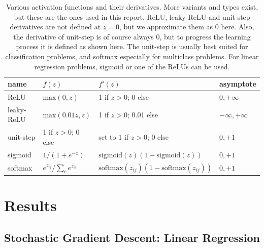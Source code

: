 \documentclass[]{article}
\begin{document}
\begin{table}[!ht]
	\caption{Various activation functions and their derivatives. More variants and types exist, but these are the ones used in this report. ReLU, leaky-ReLU and unit-step derivatives are not defined at $z=0$, but we approximate them as 0 here. Also, the derivative of unit-step is of course always 0, but to progress the learning process it is defined as shown here. The unit-step is usually best suited for classification problems, and softmax especially for multiclass problems. For linear regression problems, sigmoid or one of the ReLUs can be used.}
	\label{tab:activation-funcs}
	\begin{center}
		\begin{tabular}{l|l|l|l}
			\toprule
			name&	$f(z)$&	$f'(z)$&	asymptote \\
			\midrule
			ReLU&	$\mathrm{max}(0,z)$&	1 if $z > 0$; 0 else&	$0,+\infty$ \\
			leaky-ReLU&	$\mathrm{max}(0.01z,z)$&	1 if $z > 0$; 0.01 else&	$-\infty,+\infty$ \\
			unit-step&	1 if $z > 0$; 0 else&	set to 1 if $z > 0$; 0 else&	$0,+1$ \\
			sigmoid&	$1/(1 + e^{-z})$&	$\mathrm{sigmoid}(z)(1 - \mathrm{sigmoid}(z))$	&	$0,+1$ \\
			softmax&	$e^{z_{ij}}/\sum_{c}e^{z_{ic}}$&	$\mathrm{softmax}(z_{ij})(1 - \mathrm{softmax}(z_{ij}))$ &	$0,+1$ \\
			\bottomrule
		\end{tabular}
	\end{center}
\end{table}


\clearpage
\section{Results} \label{results}

\subsection{Stochastic Gradient Descent: Linear Regression}
\end{document}
